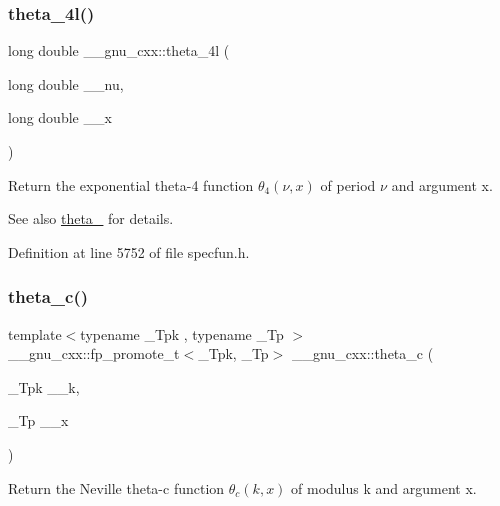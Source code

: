 \subsubsection{\texorpdfstring{theta\+\_\+4l()}{theta\_4l()}}
{\footnotesize\ttfamily long double \+\_\+\+\_\+gnu\+\_\+cxx\+::theta\+\_\+4l (\begin{DoxyParamCaption}\item[{long double}]{\+\_\+\+\_\+nu,  }\item[{long double}]{\+\_\+\+\_\+x }\end{DoxyParamCaption})\hspace{0.3cm}{\ttfamily [inline]}}

Return the exponential theta-\/4 function $ \theta_4(\nu,x) $ of period $ \nu $ and argument {\ttfamily x}.

\begin{DoxySeeAlso}{See also}
\hyperlink{group__mathsf__gnu_ga8a6f8b69272a9f205a13e1745832ada3}{theta\+\_} for details. 
\end{DoxySeeAlso}


Definition at line 5752 of file specfun.\+h.

\mbox{\label{group__mathsf__gnu_ga3ebbb6513c39e1d55b08cba7d169ce3d}} 
\subsubsection{\texorpdfstring{theta\+\_\+c()}{theta\_c()}}
{\footnotesize\ttfamily template$<$typename \+\_\+\+Tpk , typename \+\_\+\+Tp $>$ \\
\+\_\+\+\_\+gnu\+\_\+cxx\+::fp\+\_\+promote\+\_\+t$<$\+\_\+\+Tpk, \+\_\+\+Tp$>$ \+\_\+\+\_\+gnu\+\_\+cxx\+::theta\+\_\+c (\begin{DoxyParamCaption}\item[{\+\_\+\+Tpk}]{\+\_\+\+\_\+k,  }\item[{\+\_\+\+Tp}]{\+\_\+\+\_\+x }\end{DoxyParamCaption})\hspace{0.3cm}{\ttfamily [inline]}}

Return the Neville theta-\/c function $ \theta_c(k,x) $ of modulus {\ttfamily k} and argument {\ttfamily x}.

